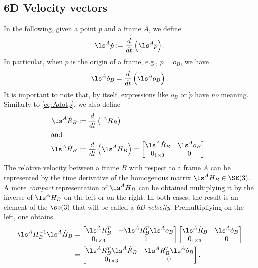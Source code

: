 \subsection{6D Velocity vectors} 
In the following, given a point $p$ and
a frame $A$, we define
\begin{align}
\label{eq:Adotp}
  \ls^A \dot p :=  \frac{d}{dt} \left( \ls^A p \right) .
\end{align}
In particular, when $p$ is the origin of a frame, e.g., $p = o_B$, we have
$$
 \ls^A \dot{o}_B =
 \frac{d}{dt} \left(\ls^A o_B \right) .
$$
It is important to note that, by itself, expressions like $\dot o_B$ or $\dot p$ have {\em no} meaning.
Similarly to \eqref{eq:Adotp}, we also define
\begin{align}
\ls^{A} \dot{R}_{B} & := \frac{d}{dt} \left( ~^{A} R_{B} \right) \\
\intertext{and} 
  \ls^A \dot H_B 
  & := \frac{d}{dt} \left( \ls^A H_B \right)
   = 
  \begin{bmatrix}
    \ls^A {\dot R}_B & \ls^A {\dot o}_B \\
     0_{1\times3} & 0
  \end{bmatrix} .
\end{align}
The relative velocity between a frame $B$ with respect to a frame $A$ can be represented by the time derivative of the homogenous matrix 
$\ls^A H_B \in \SE(3)$. A more \emph{compact} representation of 
$\ls^A {\dot H}_B$ can be obtained
multiplying it by the inverse of $\ls^A H_B$ on the left or on the right.
In both cases, the result is an element of the $\se(3)$ that will be called 
a {\em 6D velocity}. Premultipliying on the left, one obtains
\begin{align} \label{eq:se3ex}
  \ls^{A} H_{B}^{-1} \ls^{A} \dot{H}_{B}  
  & =  
  \begin{bmatrix} 
    \ls^A {R}_B^T & -\ls^A {R}_B^T \ls^Ao_B \\
    0_{1\times3} & 1
  \end{bmatrix}
  \begin{bmatrix}
    \ls^A \dot{R}_B & \ls^A{\dot o}_B \\
    0_{1\times3} & 0
  \end{bmatrix} 
  \notag\\
  & =
  \begin{bmatrix}
    \ls^AR_B^T \ls^A {\dot R}_B & \ls^AR_B^T \ls^A {\dot o}_B \\
    0_{1\times3} & 0
  \end{bmatrix} .
\end{align}
